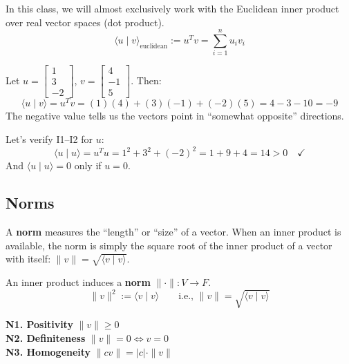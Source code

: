 \documentclass[11pt]{article}
\theoremstyle{definition}
\theoremstyle{plain}
\theoremstyle{remark}
\begin{document}
In this class, we will almost exclusively work with the Euclidean inner product over real vector spaces (dot product).
\[
\langle u \mid v \rangle_{\text{euclidean}} := u^T v = \sum_{i=1}^{n} u_i v_i
\]

\begin{workedexample}[title=\textbf{Worked Example: Computing the dot product}]
Let $u = \begin{bmatrix}1\\3\\-2\end{bmatrix}$, $v = \begin{bmatrix}4\\-1\\5\end{bmatrix}$. Then:
\[
\langle u \mid v \rangle = u^T v = (1)(4) + (3)(-1) + (-2)(5) = 4 - 3 - 10 = -9
\]
The negative value tells us the vectors point in ``somewhat opposite'' directions.

Let's verify I1--I2 for $u$:
\[
\langle u \mid u \rangle = u^T u = 1^2 + 3^2 + (-2)^2 = 1 + 9 + 4 = 14 > 0 \quad \checkmark
\]
And $\langle u \mid u \rangle = 0$ only if $u = 0$. \checkmark
\end{workedexample}

\subsection{Norms}

\begin{intuitionbox}
A \textbf{norm} measures the ``length'' or ``size'' of a vector. When an inner product is available, the norm is simply the square root of the inner product of a vector with itself: $\|v\| = \sqrt{\langle v \mid v \rangle}$.
\end{intuitionbox}

An inner product induces a \textbf{norm} $\|\cdot\| : V \to F$.
\[
\|v\|^2 := \langle v \mid v \rangle \qquad \text{i.e., } \|v\| = \sqrt{\langle v \mid v \rangle}
\]

\begin{axiombox}
\textbf{N1. Positivity} \hfill $\|v\| \geq 0$ \\[4pt]
\textbf{N2. Definiteness} \hfill $\|v\| = 0 \iff v = 0$ \\[4pt]
\textbf{N3. Homogeneity} \hfill $\|cv\| = |c| \cdot \|v\|$
\end{axiombox}
\end{document}
